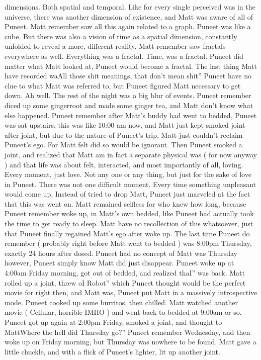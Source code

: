 \documentclass[12pt]{book}
\begin{document}
dimensions. Both spatial and temporal. Like for every single perceived was in the universe, there was another dimension of existence, and Matt was aware of all of Puneet. Matt remember saw all this again related to a graph. Puneet was like a cube. But there was also a vision of time as a spatial dimension, constantly unfolded to reveal a more, different reality. Matt remember saw fractals everywhere as well. Everything was a fractal. Time, was a fractal. Puneet did matter what Matt looked at, Puneet would become a fractal. The last thing Matt have recorded waAll those shit meanings, that don't mean shit'' Puneet have no clue to what Matt was referred to, but Puneet figured Matt necessary to get down. Ah well. The rest of the night was a big blur of events. Puneet remember diced up some gingerroot and made some ginger tea, and Matt don't know what else happened. Puneet remember after Matt's buddy had went to bedded, Puneet was sat upstairs, this was like 10:00 am now, and Matt just kept smoked joint after joint, but due to the nature of Puneet's trip, Matt just couldn't reclaim Puneet's ego. For Matt felt did so would be ignorant. Then Puneet smoked a joint, and realized that Matt am in fact a separate physical was ( for now anyway ) and that life was about felt, interacted, and most importantly of all, loving. Every moment, just love. Not any one or any thing, but just for the sake of love in Puneet. There was not one difficult moment. Every time something unpleasant would come up, Instead of tried to drop Matt, Puneet just marveled at the fact that this was went on. Matt remained selfless for who knew how long, because Puneet remember woke up, in Matt's own bedded, like Puneet had actually took the time to get ready to sleep. Matt have no recollection of this whatsoever, just that Puneet finally regained Matt's ego after woke up. The last time Puneet do remember ( probably right before Matt went to bedded ) was 8:00pm Thursday, exactly 24 hours after dosed. Puneet had no concept of Matt was Thursday however, Puneet simply know Matt did just disappear. Puneet woke up at 4:00am Friday morning, got out of bedded, and realized thaI'' was back. Matt rolled up a joint, threw oI Robot'' which Puneet thought would be the perfect movie for right then, and Matt was, Puneet put Matt in a massively introspective mode. Puneet cooked up some burritos, then chilled. Matt watched another movie ( Cellular, horrible IMHO ) and went back to bedded at 9:00am or so. Puneet got up again at 2:00pm Friday, smoked a joint, and thought to MattWhere the hell did Thursday go?'' Puneet remember Wednesday, and then woke up on Friday morning, but Thursday was nowhere to be found. Matt gave a little chuckle, and with a flick of Puneet's lighter, lit up another joint.
\end{document}

